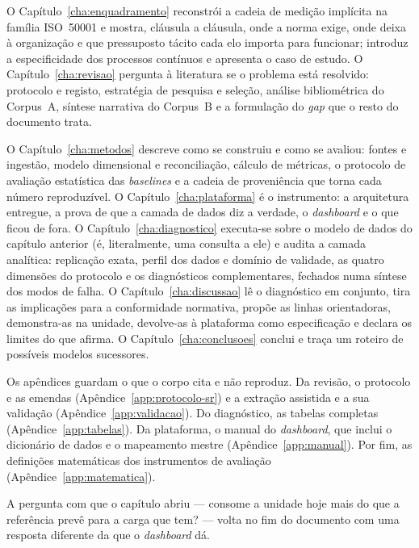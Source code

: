 O Capítulo~\ref{cha:enquadramento} reconstrói a cadeia de medição
implícita na família ISO~50001 e mostra, cláusula a cláusula, onde a
norma exige, onde deixa à organização e que pressuposto tácito cada elo
importa para funcionar; introduz a especificidade dos processos
contínuos e apresenta o caso de estudo. O Capítulo~\ref{cha:revisao}
pergunta à literatura se o problema está resolvido: protocolo e
registo, estratégia de pesquisa e seleção, análise bibliométrica do
Corpus~A, síntese narrativa do Corpus~B e a formulação do \emph{gap}
que o resto do documento trata.

O Capítulo~\ref{cha:metodos} descreve como se construiu e como se
avaliou: fontes e ingestão, modelo dimensional e reconciliação, cálculo
de métricas, o protocolo de avaliação estatística das \emph{baselines}
e a cadeia de proveniência que torna cada número reproduzível. O
Capítulo~\ref{cha:plataforma} é o instrumento: a arquitetura entregue,
a prova de que a camada de dados diz a verdade, o \emph{dashboard} e o
que ficou de fora. O Capítulo~\ref{cha:diagnostico} executa-se sobre o
modelo de dados do capítulo anterior (é, literalmente, uma consulta a
ele) e audita a camada analítica: replicação exata, perfil dos dados e
domínio de validade, as quatro dimensões do protocolo e os diagnósticos
complementares, fechados numa síntese dos modos de falha. O
Capítulo~\ref{cha:discussao} lê o diagnóstico em conjunto, tira as
implicações para a conformidade normativa, propõe as linhas
orientadoras, demonstra-as na unidade, devolve-as à plataforma como
especificação e declara os limites do que afirma. O
Capítulo~\ref{cha:conclusoes} conclui e traça um roteiro de possíveis modelos
sucessores.


Os apêndices guardam o que o corpo cita e não reproduz. Da revisão, o
protocolo e as emendas (Apêndice~\ref{app:protocolo-sr}) e a extração
assistida e a sua validação (Apêndice~\ref{app:validacao}). Do diagnóstico,
as tabelas completas (Apêndice~\ref{app:tabelas}). Da plataforma, o manual
do \emph{dashboard}, que inclui o dicionário de dados e o mapeamento mestre
(Apêndice~\ref{app:manual}). Por fim, as definições matemáticas dos
instrumentos de avaliação (Apêndice~\ref{app:matematica}).

A pergunta com que o capítulo abriu --- consome a unidade hoje mais do
que a referência prevê para a carga que tem? --- volta no fim do
documento com uma resposta diferente da que o \emph{dashboard} dá.